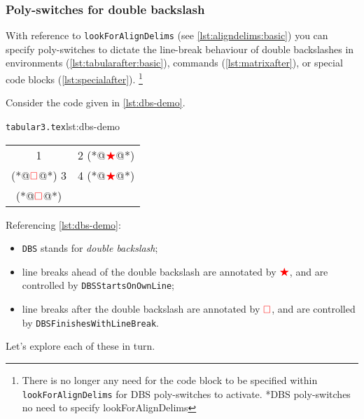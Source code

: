 \subsubsection{Poly-switches for double backslash}\label{subsec:dbs}
 With reference to \texttt{lookForAlignDelims} (see \vref{lst:aligndelims:basic})
  you can specify poly-switches to
 dictate the line-break behaviour of double backslashes in environments
 (\vref{lst:tabularafter:basic}), commands (\vref{lst:matrixafter}), or special code
 blocks (\vref{lst:specialafter}). \footnote{There is no longer any need for the code
 block to be specified within \texttt{lookForAlignDelims} for DBS poly-switches to
 activate. *{DBS poly-switches no need to specify lookForAlignDelims}}

 Consider the code given in \cref{lst:dbs-demo}.
 \begin{cmhlistings}[style=tcblatex,escapeinside={(*@}{@*)}]{\texttt{tabular3.tex}}{lst:dbs-demo}
\begin{tabular}{cc}
 1 & 2 (*@$\color{red}\bigstar$@*)\\(*@$\color{red}\square$@*) 3 & 4 (*@$\color{red}\bigstar$@*)\\(*@$\color{red}\square$@*)
\end{tabular}
\end{cmhlistings}
 Referencing \cref{lst:dbs-demo}:
 \begin{itemize}
  \item \texttt{DBS} stands for \emph{double backslash};
  \item line breaks ahead of the double backslash are annotated by
        $\color{red}\bigstar$, and are controlled by \texttt{DBSStartsOnOwnLine};
  \item line breaks after the double backslash are annotated by
        $\color{red}\square$, and are controlled by
        \texttt{DBSFinishesWithLineBreak}.
 \end{itemize}

 Let's explore each of these in turn.

